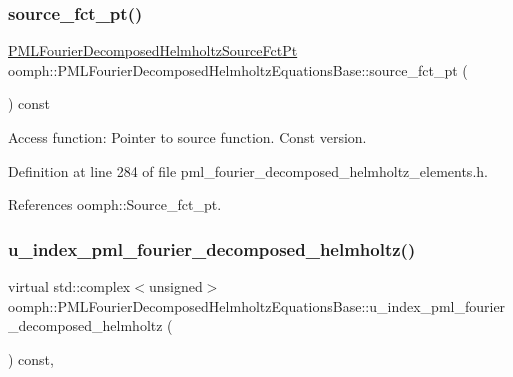 \subsubsection{\texorpdfstring{source\+\_\+fct\+\_\+pt()}{source\_fct\_pt()}\hspace{0.1cm}{\footnotesize\ttfamily [2/2]}}
{\footnotesize\ttfamily \hyperlink{classoomph_1_1PMLFourierDecomposedHelmholtzEquationsBase_a2e749d98392af2109b41dca0ae618b79}{P\+M\+L\+Fourier\+Decomposed\+Helmholtz\+Source\+Fct\+Pt} oomph\+::\+P\+M\+L\+Fourier\+Decomposed\+Helmholtz\+Equations\+Base\+::source\+\_\+fct\+\_\+pt (\begin{DoxyParamCaption}{ }\end{DoxyParamCaption}) const\hspace{0.3cm}{\ttfamily [inline]}}



Access function\+: Pointer to source function. Const version. 



Definition at line 284 of file pml\+\_\+fourier\+\_\+decomposed\+\_\+helmholtz\+\_\+elements.\+h.



References oomph\+::\+Source\+\_\+fct\+\_\+pt.

\mbox{\label{classoomph_1_1PMLFourierDecomposedHelmholtzEquationsBase_a7329e43f0e0762bf584d0bf7a99a3a67}} 
\subsubsection{\texorpdfstring{u\+\_\+index\+\_\+pml\+\_\+fourier\+\_\+decomposed\+\_\+helmholtz()}{u\_index\_pml\_fourier\_decomposed\_helmholtz()}}
{\footnotesize\ttfamily virtual std\+::complex$<$unsigned$>$ oomph\+::\+P\+M\+L\+Fourier\+Decomposed\+Helmholtz\+Equations\+Base\+::u\+\_\+index\+\_\+pml\+\_\+fourier\+\_\+decomposed\+\_\+helmholtz (\begin{DoxyParamCaption}{ }\end{DoxyParamCaption}) const\hspace{0.3cm}{\ttfamily [inline]}, {\ttfamily [virtual]}}



